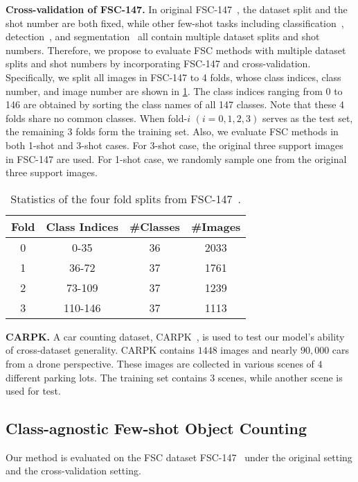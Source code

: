 \documentclass[10pt,twocolumn,letterpaper]{article}
\begin{document}
\vspace{2pt}\noindent \textbf{Cross-validation of FSC-147.}  
In original FSC-147~\cite{famnet}, the dataset split and the shot number are both fixed, while other few-shot tasks including classification~\cite{wertheimer2021few}, detection~\cite{fan2020few}, and segmentation~\cite{yang2021mining} all contain multiple dataset splits and shot numbers. 
Therefore, we propose to evaluate FSC methods with multiple dataset splits and shot numbers by incorporating FSC-147 and cross-validation. 
Specifically, we split all images in FSC-147 to 4 folds, whose class indices, class number, and image number are shown in \cref{tab:fold}. 
The class indices ranging from 0 to 146 are obtained by sorting the class names of all 147 classes.
Note that these 4 folds share no common classes. 
When fold-$i$ $(i=0,1,2,3)$ serves as the test set, the remaining 3 folds form the training set. 
Also, we evaluate FSC methods in both 1-shot and 3-shot cases. 
For 3-shot case, the original three support images in FSC-147 are used. 
For 1-shot case, we randomly sample one from the original three support images. 


\begin{table}[t]
\setlength\tabcolsep{5pt}
\centering
\scriptsize
\caption{Statistics of the four fold splits from FSC-147~\cite{famnet}.}
\begin{tabular}{cccc}
\toprule
Fold & Class Indices & \#Classes & \#Images  \\
\midrule
0 & 0-35         & 36 & 2033 \\
1 & 36-72        & 37 & 1761 \\
2 & 73-109       & 37 & 1239 \\
3 & 110-146      & 37 & 1113 \\
\bottomrule
\end{tabular}
\label{tab:fold}
\vspace{-10pt}
\end{table}


\vspace{2pt}\noindent \textbf{CARPK.} A car counting dataset, CARPK~\cite{lpn}, is used to test our model’s ability of cross-dataset generality. CARPK contains $1448$ images and nearly $90,000$ cars from a drone perspective. These images are collected in various scenes of $4$ different parking lots. The training set contains $3$ scenes, while another scene is used for test. 


\subsection{Class-agnostic Few-shot Object Counting} \label{sec:fsc_147}
Our method is evaluated on the FSC dataset FSC-147~\cite{famnet} under the original setting and the cross-validation setting. 
\end{document}
